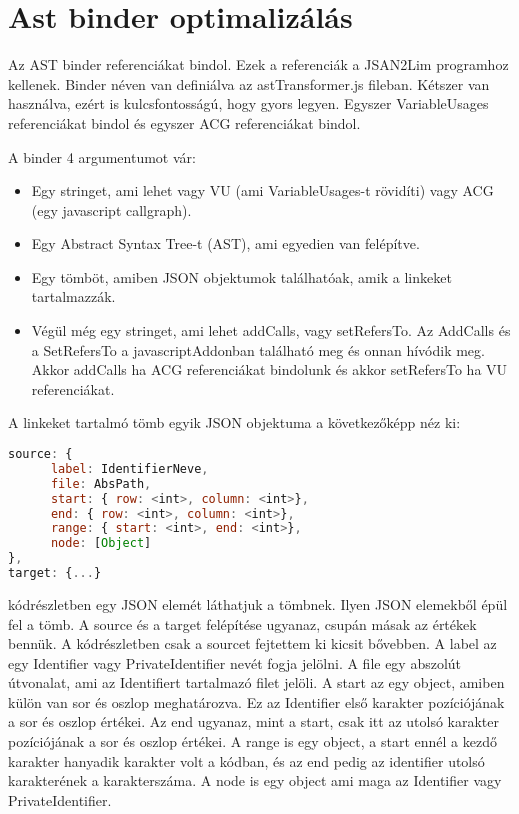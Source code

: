 \section{Ast binder optimalizálás}

Az AST binder referenciákat bindol. Ezek a referenciák a JSAN2Lim programhoz kellenek.
Binder néven van definiálva az astTransformer.js fileban.
Kétszer van használva, ezért is kulcsfontosságú, hogy gyors legyen.
Egyszer VariableUsages referenciákat bindol és egyszer ACG referenciákat bindol.

\noindent

A binder 4 argumentumot vár:

\begin{itemize}
      \item Egy stringet, ami lehet vagy VU (ami VariableUsages-t rövidíti) vagy ACG (egy javascript callgraph).
      \item Egy Abstract Syntax Tree-t (AST), ami egyedien van felépítve.
      \item Egy tömböt, amiben JSON objektumok találhatóak, amik a linkeket tartalmazzák.
      \item Végül még egy stringet, ami lehet addCalls, vagy setRefersTo. Az AddCalls és a SetRefersTo a javascriptAddonban található meg és onnan hívódik meg.
      Akkor addCalls ha ACG referenciákat bindolunk és akkor setRefersTo ha VU referenciákat.
\end{itemize}

A linkeket tartalmó tömb egyik JSON objektuma a következőképp néz ki:

\begin{lstlisting}[caption={Binder JSON argumentuma}, label={lst:binder_json_arg}, language={JavaScript}]
source: {
      label: IdentifierNeve,
      file: AbsPath,
      start: { row: <int>, column: <int>},
      end: { row: <int>, column: <int>},
      range: { start: <int>, end: <int>},
      node: [Object]
},
target: {...}
\end{lstlisting}

 kódrészletben egy JSON elemét láthatjuk a tömbnek. Ilyen JSON elemekből épül fel a tömb.
A source és a target felépítése ugyanaz, csupán másak az értékek bennük.
A kódrészletben csak a sourcet fejtettem ki kicsit bővebben. A label az egy Identifier vagy PrivateIdentifier nevét fogja jelölni.
A file egy abszolút útvonalat, ami az Identifiert tartalmazó filet jelöli.
A start az egy object, amiben külön van sor és oszlop meghatározva. Ez az Identifier első karakter pozíciójának a sor és oszlop értékei.
Az end ugyanaz, mint a start, csak itt az utolsó karakter pozíciójának a sor és oszlop értékei.
A range is egy object, a start ennél a kezdő karakter hanyadik karakter volt a kódban, és az end pedig az identifier utolsó karakterének a karakterszáma.
A node is egy object ami maga az Identifier vagy PrivateIdentifier.

